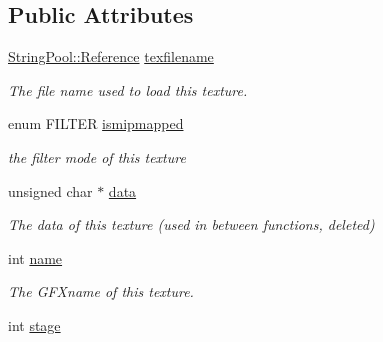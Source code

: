 \subsection*{Public Attributes}
\begin{DoxyCompactItemize}
\item 
\hyperlink{classSharedPool_1_1Reference}{String\+Pool\+::\+Reference} \hyperlink{classTexture_aea05e2470a26a6b4c5b42b5e5709e6f8}{texfilename}\hypertarget{classTexture_aea05e2470a26a6b4c5b42b5e5709e6f8}{}\label{classTexture_aea05e2470a26a6b4c5b42b5e5709e6f8}

\begin{DoxyCompactList}\small\item\em The file name used to load this texture. \end{DoxyCompactList}\item 
enum F\+I\+L\+T\+ER \hyperlink{classTexture_a6d6d79e546a62f8103aa4a74a419e713}{ismipmapped}\hypertarget{classTexture_a6d6d79e546a62f8103aa4a74a419e713}{}\label{classTexture_a6d6d79e546a62f8103aa4a74a419e713}

\begin{DoxyCompactList}\small\item\em the filter mode of this texture \end{DoxyCompactList}\item 
unsigned char $\ast$ \hyperlink{classTexture_ab0308cd773b72a1ba4e061f2145f5bfc}{data}\hypertarget{classTexture_ab0308cd773b72a1ba4e061f2145f5bfc}{}\label{classTexture_ab0308cd773b72a1ba4e061f2145f5bfc}

\begin{DoxyCompactList}\small\item\em The data of this texture (used in between functions, deleted) \end{DoxyCompactList}\item 
int \hyperlink{classTexture_a7a67d7de5c0c57db884feb4d7228aaf0}{name}\hypertarget{classTexture_a7a67d7de5c0c57db884feb4d7228aaf0}{}\label{classTexture_a7a67d7de5c0c57db884feb4d7228aaf0}

\begin{DoxyCompactList}\small\item\em The G\+F\+Xname of this texture. \end{DoxyCompactList}\item 
int \hyperlink{classTexture_aa38999434f9fcf409ca20b4523852b7b}{stage}\hypertarget{classTexture_aa38999434f9fcf409ca20b4523852b7b}{}\label{classTexture_aa38999434f9fcf409ca20b4523852b7b}


\end{DoxyCompactItemize}
